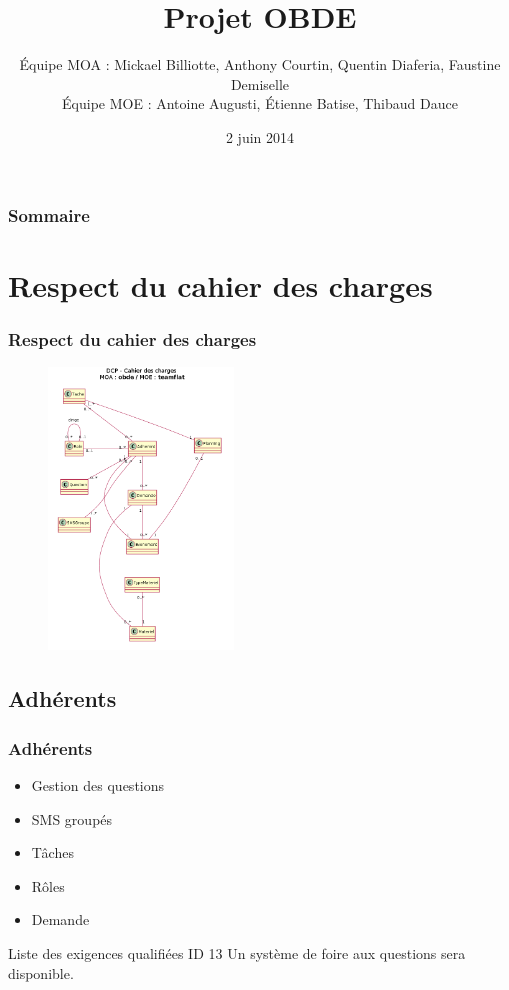 \documentclass[handout]{beamer}
\title{
	Projet OBDE\\
}
\author{
	Équipe MOA : Mickael Billiotte, Anthony Courtin, Quentin Diaferia, Faustine Demiselle\\
	\vspace{10px}
	Équipe MOE : Antoine Augusti, Étienne Batise,  Thibaud Dauce
}
\date{2 juin 2014}
\begin{document}
	\begin{frame}[plain]
		\titlepage
	\end{frame}

	\begin{frame}[plain]
		\frametitle{Sommaire}
		\tableofcontents
	\end{frame}

\section{Respect du cahier des charges}

\begin{frame}
	\frametitle{Respect du cahier des charges}

	\begin{figure}
   	\includegraphics[height= 7.5cm]{images/dcp01.png}
	\end{figure}

\end{frame}

	\subsection{Adhérents}
	\begin{frame}
		\frametitle{Adhérents}

		\begin{itemize}
			\item Gestion des questions
			\item SMS groupés
			\item Tâches
			\item Rôles
			\item Demande
		\end{itemize}

		\begin{exampleblock}{Liste des exigences qualifiées ID 13}
			Un système de foire aux questions sera disponible.
		\end{exampleblock}
	\end{frame}
\end{document}
